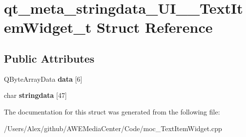 \hypertarget{structqt__meta__stringdata___u_i_____text_item_widget__t}{\section{qt\-\_\-meta\-\_\-stringdata\-\_\-\-U\-I\-\_\-\-\_\-\-Text\-Item\-Widget\-\_\-t Struct Reference}
\label{structqt__meta__stringdata___u_i_____text_item_widget__t}
}
\subsection*{Public Attributes}
\begin{DoxyCompactItemize}
\item 
\hypertarget{structqt__meta__stringdata___u_i_____text_item_widget__t_a8c28fd9d6d8c065403a0356c39baa1b0}{Q\-Byte\-Array\-Data {\bfseries data} \mbox{[}6\mbox{]}}\label{structqt__meta__stringdata___u_i_____text_item_widget__t_a8c28fd9d6d8c065403a0356c39baa1b0}

\item 
\hypertarget{structqt__meta__stringdata___u_i_____text_item_widget__t_ae6dc44c20f40a7c9aa5b96ca1d93f595}{char {\bfseries stringdata} \mbox{[}47\mbox{]}}\label{structqt__meta__stringdata___u_i_____text_item_widget__t_ae6dc44c20f40a7c9aa5b96ca1d93f595}

\end{DoxyCompactItemize}


The documentation for this struct was generated from the following file\-:\begin{DoxyCompactItemize}
\item 
/\-Users/\-Alex/github/\-A\-W\-E\-Media\-Center/\-Code/moc\-\_\-\-Text\-Item\-Widget.\-cpp\end{DoxyCompactItemize}
